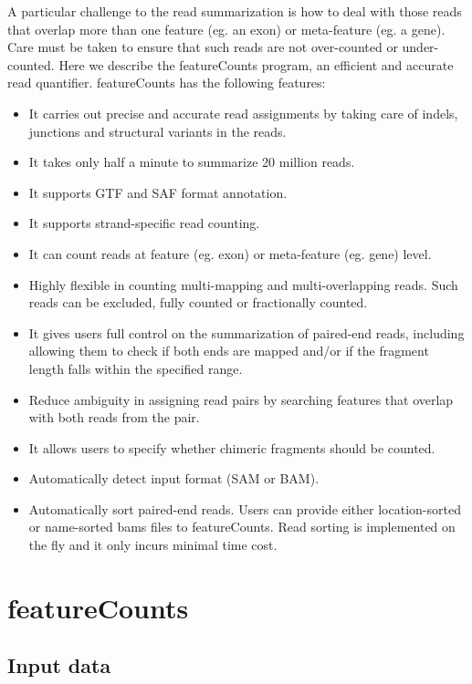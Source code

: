 \documentclass[12pt]{report}
\newcommand{\featureCounts}{\textsf{featureCounts}}
\begin{document}
A particular challenge to the read summarization is how to deal with those reads that overlap more than one feature (eg. an exon) or meta-feature (eg. a gene).
Care must be taken to ensure that such reads are not over-counted or under-counted.
Here we describe the {\featureCounts} program, an efficient and accurate read quantifier.
{\featureCounts} has the following features:
\begin{itemize}
\item It carries out precise and accurate read assignments by taking care of indels, junctions and structural variants in the reads.
\item It takes only half a minute to summarize 20 million reads.
\item It supports GTF and SAF format annotation.
\item It supports strand-specific read counting.
\item It can count reads at feature (eg. exon) or meta-feature (eg. gene) level.
\item Highly flexible in counting multi-mapping and multi-overlapping reads. Such reads can be excluded, fully counted or fractionally counted.
\item It gives users full control on the summarization of paired-end reads, including allowing them to check if both ends are mapped and/or if the fragment length falls within the specified range.
\item Reduce ambiguity in assigning read pairs by searching features that overlap with both reads from the pair.
\item It allows users to specify whether chimeric fragments should be counted.
\item Automatically detect input format (SAM or BAM).
\item Automatically sort paired-end reads. Users can provide either location-sorted or name-sorted bams files to featureCounts. Read sorting is implemented on the fly and it only incurs minimal time cost.
\end{itemize}

\section{featureCounts}
\label{sec:featureCounts}

\subsection{Input data}
\end{document}
